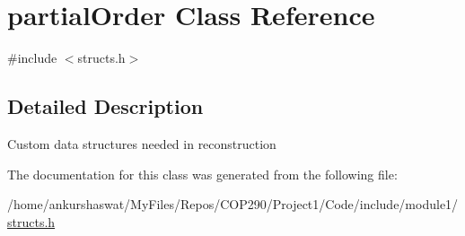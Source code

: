 \hypertarget{classpartialOrder}{}\section{partial\+Order Class Reference}
\label{classpartialOrder}


{\ttfamily \#include $<$structs.\+h$>$}



\subsection{Detailed Description}
Custom data structures needed in reconstruction 

The documentation for this class was generated from the following file\+:\begin{DoxyCompactItemize}
\item 
/home/ankurshaswat/\+My\+Files/\+Repos/\+C\+O\+P290/\+Project1/\+Code/include/module1/\hyperlink{structs_8h}{structs.\+h}\end{DoxyCompactItemize}
